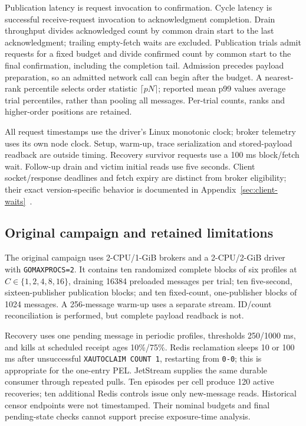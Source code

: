 \documentclass[11pt]{article}
\theoremstyle{definition}
\newcommand{\code}[1]{\texttt{#1}}
\begin{document}
Publication latency is request invocation to confirmation. Cycle latency is successful receive-request invocation to acknowledgment completion. Drain throughput divides acknowledged count by common drain start to the last acknowledgment; trailing empty-fetch waits are excluded. Publication trials admit requests for a fixed budget and divide confirmed count by common start to the final confirmation, including the completion tail. Admission precedes payload preparation, so an admitted network call can begin after the budget. A nearest-rank percentile selects order statistic $\lceil pN\rceil$; reported mean p99 values average trial percentiles, rather than pooling all messages. Per-trial counts, ranks and higher-order positions are retained.

All request timestamps use the driver's Linux monotonic clock; broker telemetry uses its own node clock. Setup, warm-up, trace serialization and stored-payload readback are outside timing. Recovery survivor requests use a 100 ms block/fetch wait. Follow-up drain and victim initial reads use five seconds. Client socket/response deadlines and fetch expiry are distinct from broker eligibility; their exact version-specific behavior is documented in Appendix~\ref{sec:client-waits}~\cite{goredis970timeouts,natsgo1391}.

\subsection{Original campaign and retained limitations}

The original campaign uses 2-CPU/1-GiB brokers and a 2-CPU/2-GiB driver with \code{GOMAXPROCS=2}. It contains ten randomized complete blocks of six profiles at $C\in\{1,2,4,8,16\}$, draining 16384 preloaded messages per trial; ten five-second, sixteen-publisher publication blocks; and ten fixed-count, one-publisher blocks of 1024 messages. A 256-message warm-up uses a separate stream. ID/count reconciliation is performed, but complete payload readback is not.

Recovery uses one pending message in periodic profiles, thresholds 250/1000 ms, and kills at scheduled receipt ages 10\%/75\%. Redis reclamation sleeps 10 or 100 ms after unsuccessful \code{XAUTOCLAIM COUNT 1}, restarting from \code{0-0}; this is appropriate for the one-entry PEL. JetStream supplies the same durable consumer through repeated pulls. Ten episodes per cell produce 120 active recoveries; ten additional Redis controls issue only new-message reads. Historical censor endpoints were not timestamped. Their nominal budgets and final pending-state checks cannot support precise exposure-time analysis.
\end{document}
